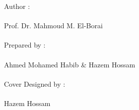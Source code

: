 \par
\vspace*{5cm}
{\fontsize{20pt}{0}
    Author : \\\\
    \color{white} \fancyfont Prof. Dr. Mahmoud M. El-Borai
    \\ \\ 
    \color{cover}Prepared by :\\\\
    \color{white} \fancyfont Ahmed Mohamed Habib \& Hazem Hossam
    \\ \\
    \color{cover} Cover Designed by :\\\\
    \color{white} \fancyfont Hazem Hossam
}
\restoregeometry
\endgroup
